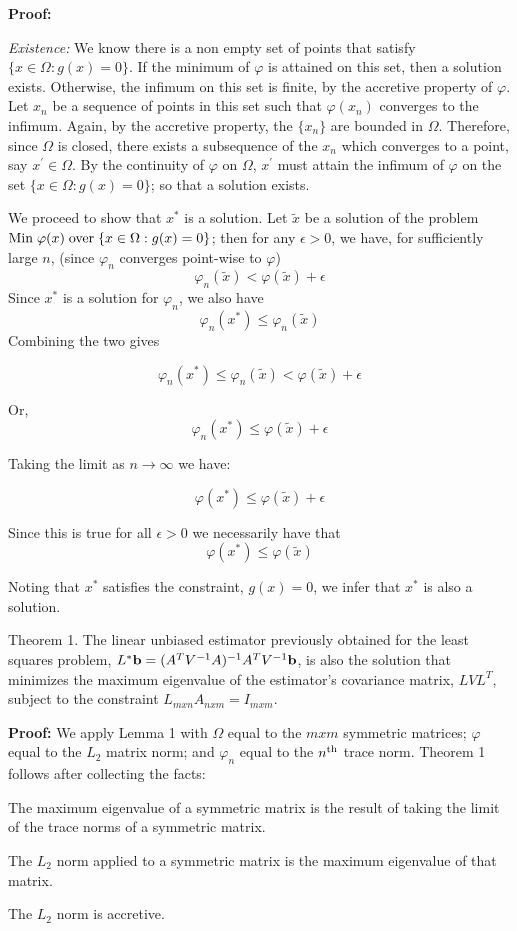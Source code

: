 {\bf Proof:\/} 

{\it Existence:\/}
We know there is a non empty set of points that satisfy
$\{x \in \Omega: g(x) = 0\}$. If the minimum of $\varphi$ is attained 
on this set, then a solution exists. Otherwise, the infimum on this set 
is finite, by the accretive property of $\varphi$. 
Let $x_n$ be a sequence of points in this set 
such that $\varphi(x_n)$ converges to the infimum. Again, by the
accretive property, the $\{x_n\}$ are bounded in $\Omega$. Therefore,
since $\Omega$ is closed, 
there exists a subsequence of the $x_n$ which converges to a point, say
$x^\prime \in \Omega$. By the continuity of $\varphi$ on $\Omega$,
$x^\prime$ 
must attain the infimum of
$\varphi$ on the set $\{x \in \Omega : g(x) = 0\}$; so that a solution exists.

We proceed to show that $x^*$ is a solution.
Let ${\tilde x}$ be a solution of the problem 
${\rm Min}\; \varphi(x) \; {\rm over} \; \{x \in \Omega : g(x) = 0\}$;
then for any $\epsilon > 0$, we have, for sufficiently large $n$, 
(since $\varphi_n$ converges point-wise to $\varphi$)
$$
 \varphi_n({\tilde x}) < \varphi({\tilde x}) + \epsilon
$$
Since $x^*$ is a solution for $\varphi_n$, we also have
$$
\varphi_n(x^*) \le \varphi_n({\tilde x})
$$
Combining the two gives

$$
\varphi_n(x^*) \le \varphi_n({\tilde x}) < \varphi({\tilde x}) + \epsilon
$$

Or,
$$
\varphi_n(x^*) \le \varphi({\tilde x}) + \epsilon
$$

Taking the limit as $n \rightarrow \infty$ we have:

$$
\varphi(x^*) \le \varphi({\tilde x}) + \epsilon
$$

Since this is true for all $\epsilon > 0$ we necessarily have that
$$
\varphi(x^*) \le \varphi({\tilde x})
$$

Noting that $x^*$ satisfies the constraint, $g(x) = 0$, we infer that 
$x^*$ is also a solution.


\proclaim Theorem 1. The linear unbiased estimator previously obtained for the
least squares problem, $L^*{\bf b} =
(A^TV^{-1}A)^{-1}A^TV^{-1}{\bf b}$, is also the solution that
minimizes the maximum eigenvalue of the estimator's covariance matrix, 
$LVL^T$, subject to the constraint $L_{mxn}A_{nxm} = I_{mxm}$.

{\bf Proof:\/} We apply Lemma 1 with $\Omega$ equal to the $mxm$ symmetric
matrices; $\varphi$ equal to the $L_2$ matrix norm; and
$\varphi_n$ equal to the $n^{\rm th}$ trace norm. Theorem 1 follows
after collecting the facts: 

\item{The maximum eigenvalue of a symmetric matrix is the result of 
taking the limit of the trace norms of a symmetric matrix.}
\item{The $L_2$ norm applied to a symmetric matrix is the maximum
eigenvalue of that matrix.}
\item{The $L_2$ norm is accretive.}


\bye

